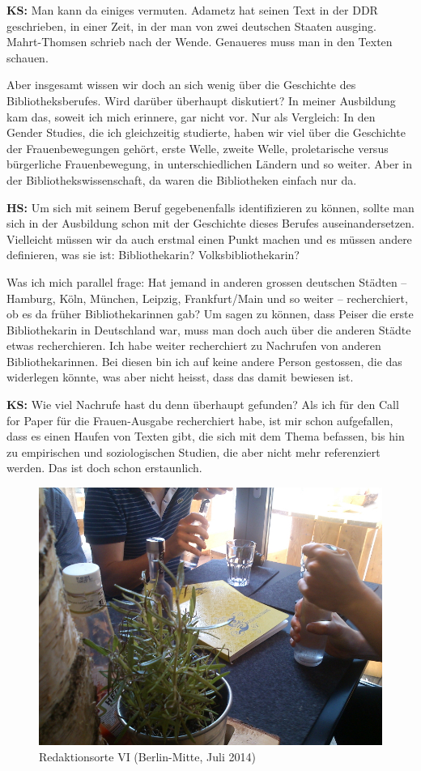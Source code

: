 \documentclass[a4paper,
fontsize=11pt,
oneside,
numbers=noperiodatend,
parskip=half-,
bibliography=totoc,
final
]{scrartcl}
\begin{document}
\textbf{KS:} Man kann da einiges vermuten. Adametz hat seinen Text in
der DDR geschrieben, in einer Zeit, in der man von zwei deutschen
Staaten ausging. Mahrt-Thomsen schrieb nach der Wende. Genaueres muss
man in den Texten schauen.

Aber insgesamt wissen wir doch an sich wenig über die Geschichte des
Bibliotheksberufes. Wird darüber überhaupt diskutiert? In meiner
Ausbildung kam das, soweit ich mich erinnere, gar nicht vor. Nur als
Vergleich: In den Gender Studies, die ich gleichzeitig studierte, haben
wir viel über die Geschichte der Frauenbewegungen gehört, erste Welle,
zweite Welle, proletarische versus bürgerliche Frauenbewegung, in
unterschiedlichen Ländern und so weiter. Aber in der
Bibliothekswissenschaft, da waren die Bibliotheken einfach nur da.

\textbf{HS:} Um sich mit seinem Beruf gegebenenfalls identifizieren zu
können, sollte man sich in der Ausbildung schon mit der Geschichte
dieses Berufes auseinandersetzen. Vielleicht müssen wir da auch erstmal
einen Punkt machen und es müssen andere definieren, was sie ist:
Bibliothekarin? Volksbibliothekarin?

Was ich mich parallel frage: Hat jemand in anderen grossen deutschen
Städten -- Hamburg, Köln, München, Leipzig, Frankfurt/Main und so weiter
-- recherchiert, ob es da früher Bibliothekarinnen gab? Um sagen zu
können, dass Peiser die erste Bibliothekarin in Deutschland war, muss
man doch auch über die anderen Städte etwas recherchieren. Ich habe
weiter recherchiert zu Nachrufen von anderen Bibliothekarinnen. Bei
diesen bin ich auf keine andere Person gestossen, die das widerlegen
könnte, was aber nicht heisst, dass das damit bewiesen ist.

\textbf{KS:} Wie viel Nachrufe hast du denn überhaupt gefunden? Als ich
für den Call for Paper für die Frauen-Ausgabe recherchiert habe, ist mir
schon aufgefallen, dass es einen Haufen von Texten gibt, die sich mit
dem Thema befassen, bis hin zu empirischen und soziologischen Studien,
die aber nicht mehr referenziert werden. Das ist doch schon erstaunlich.

\begin{figure}[htbp]
\centering
\includegraphics{editorialbild.jpg}
\caption{Redaktionsorte VI (Berlin-Mitte, Juli 2014)}
\end{figure}
\end{document}

